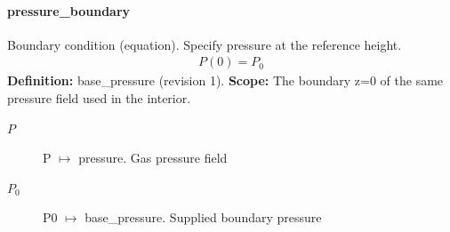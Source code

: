 \paragraph{pressure\_boundary}
Boundary condition (equation). Specify pressure at the reference height.
\begin{equation}
\begin{aligned}
P(0)=P_0
\end{aligned}
\label{eq:example.isothermal_5f_atmosphere_3a_atmosphere:pressure_5f_boundary:1}
\end{equation}
\noindent\textbf{Definition:} base\_pressure (revision 1).
\textbf{Scope:} The boundary z=0 of the same pressure field used in the interior.

\begin{description}
\item[$P$] P $\mapsto$ pressure. Gas pressure field
\item[$P_0$] P0 $\mapsto$ base\_pressure. Supplied boundary pressure
\end{description}
